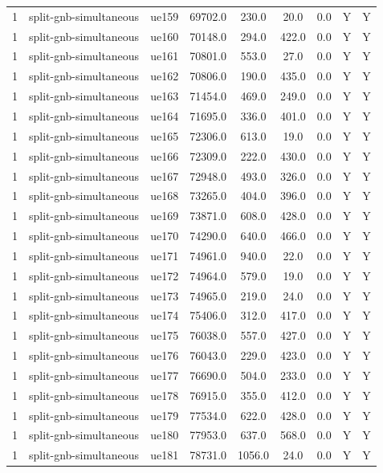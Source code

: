 \begin{table}[ht]
\begin{tabular}{|c|c|c|c|c|c|c|c|c|}
1 & split-gnb-simultaneous & ue159 & 69702.0 & 230.0 & 20.0 & 0.0 & Y & Y \\
1 & split-gnb-simultaneous & ue160 & 70148.0 & 294.0 & 422.0 & 0.0 & Y & Y \\
1 & split-gnb-simultaneous & ue161 & 70801.0 & 553.0 & 27.0 & 0.0 & Y & Y \\
1 & split-gnb-simultaneous & ue162 & 70806.0 & 190.0 & 435.0 & 0.0 & Y & Y \\
1 & split-gnb-simultaneous & ue163 & 71454.0 & 469.0 & 249.0 & 0.0 & Y & Y \\
1 & split-gnb-simultaneous & ue164 & 71695.0 & 336.0 & 401.0 & 0.0 & Y & Y \\
1 & split-gnb-simultaneous & ue165 & 72306.0 & 613.0 & 19.0 & 0.0 & Y & Y \\
1 & split-gnb-simultaneous & ue166 & 72309.0 & 222.0 & 430.0 & 0.0 & Y & Y \\
1 & split-gnb-simultaneous & ue167 & 72948.0 & 493.0 & 326.0 & 0.0 & Y & Y \\
1 & split-gnb-simultaneous & ue168 & 73265.0 & 404.0 & 396.0 & 0.0 & Y & Y \\
1 & split-gnb-simultaneous & ue169 & 73871.0 & 608.0 & 428.0 & 0.0 & Y & Y \\
1 & split-gnb-simultaneous & ue170 & 74290.0 & 640.0 & 466.0 & 0.0 & Y & Y \\
1 & split-gnb-simultaneous & ue171 & 74961.0 & 940.0 & 22.0 & 0.0 & Y & Y \\
1 & split-gnb-simultaneous & ue172 & 74964.0 & 579.0 & 19.0 & 0.0 & Y & Y \\
1 & split-gnb-simultaneous & ue173 & 74965.0 & 219.0 & 24.0 & 0.0 & Y & Y \\
1 & split-gnb-simultaneous & ue174 & 75406.0 & 312.0 & 417.0 & 0.0 & Y & Y \\
1 & split-gnb-simultaneous & ue175 & 76038.0 & 557.0 & 427.0 & 0.0 & Y & Y \\
1 & split-gnb-simultaneous & ue176 & 76043.0 & 229.0 & 423.0 & 0.0 & Y & Y \\
1 & split-gnb-simultaneous & ue177 & 76690.0 & 504.0 & 233.0 & 0.0 & Y & Y \\
1 & split-gnb-simultaneous & ue178 & 76915.0 & 355.0 & 412.0 & 0.0 & Y & Y \\
1 & split-gnb-simultaneous & ue179 & 77534.0 & 622.0 & 428.0 & 0.0 & Y & Y \\
1 & split-gnb-simultaneous & ue180 & 77953.0 & 637.0 & 568.0 & 0.0 & Y & Y \\
1 & split-gnb-simultaneous & ue181 & 78731.0 & 1056.0 & 24.0 & 0.0 & Y & Y \\

\end{tabular}
\end{table}

